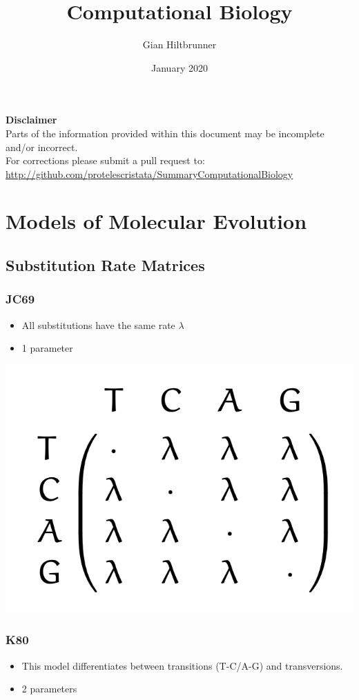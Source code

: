 \documentclass{article}
\title{\textbf{Computational Biology}}
\author{Gian Hiltbrunner}
\date{January 2020}
\begin{document}
\begin{multicols*}{3}


\maketitle
\vspace{-0.7cm}
\begin{mdframed}[backgroundcolor=lred] 
    \textbf{Disclaimer}\\
    Parts of the information provided within this document may be incomplete and/or incorrect.\\For corrections please submit a pull request to:
    \url{http://github.com/protelescristata/SummaryComputationalBiology}
\end{mdframed}

\section{Models of Molecular Evolution}
\subsection{Substitution Rate Matrices}

\subsubsection{JC69}
\begin{itemize}
    \item  All substitutions have the same rate $\lambda$
    \item 1 parameter
\end{itemize}

\begin{center}
    \includegraphics[width=0.5\linewidth]{js69.png}
\end{center}

\subsubsection{K80}
\begin{itemize}
    \item This model differentiates between transitions (T-C/A-G) and transversions. 
    \item 2 parameters
\end{itemize}


\end{multicols*}
\end{document}
